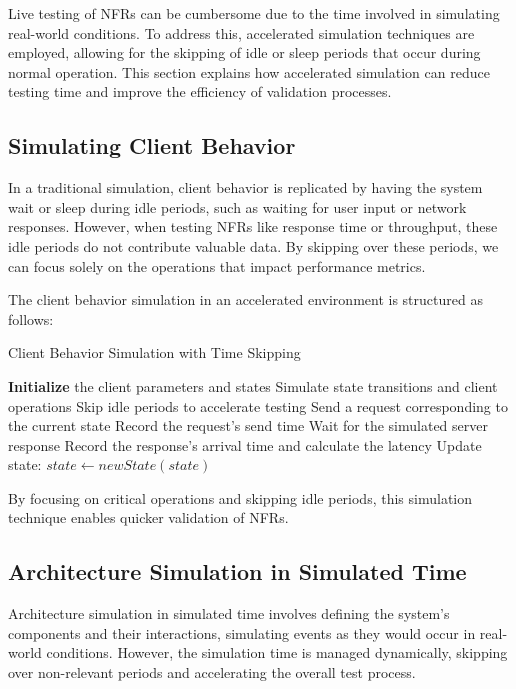 Live testing of NFRs can be cumbersome due to the time involved in simulating real-world conditions. To address this, accelerated simulation techniques are employed, allowing for the skipping of idle or sleep periods that occur during normal operation. This section explains how accelerated simulation can reduce testing time and improve the efficiency of validation processes.

\subsection{Simulating Client Behavior}

In a traditional simulation, client behavior is replicated by having the system wait or sleep during idle periods, such as waiting for user input or network responses. However, when testing NFRs like response time or throughput, these idle periods do not contribute valuable data. By skipping over these periods, we can focus solely on the operations that impact performance metrics.

The client behavior simulation in an accelerated environment is structured as follows:

\begin{algorithm}[H]
\caption{Client Behavior Simulation with Time Skipping} \label{alg:client_time_skipping}
\begin{algorithmic}[1]
    \STATE \textbf{Initialize} the client parameters and states
        \STATE Simulate state transitions and client operations
        \STATE Skip idle periods to accelerate testing
        \STATE Send a request corresponding to the current state
        \STATE Record the request’s send time
        \STATE Wait for the simulated server response
        \STATE Record the response’s arrival time and calculate the latency
        \STATE Update state: $state \leftarrow newState(state)$
    \ENDWHILE
\end{algorithmic}
\end{algorithm}

By focusing on critical operations and skipping idle periods, this simulation technique enables quicker validation of NFRs.

\subsection{Architecture Simulation in Simulated Time}

Architecture simulation in simulated time involves defining the system’s components and their interactions, simulating events as they would occur in real-world conditions. However, the simulation time is managed dynamically, skipping over non-relevant periods and accelerating the overall test process.

